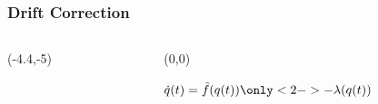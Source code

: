 \begin{frame}
	\frametitle{Drift Correction}
		\begin{columns}[T] %
			\begin{column}{.55\textwidth}
			\centering
				\begin{textblock}{0}(-4.4,-5)
					
				\end{textblock}
			\end{column}
			\hfill
			\begin{column}{0.45\textwidth}
				\begin{textblock}{.9\columnwidth}(0,0)
					\begin{block}{}
					\centering
						\( \dot{q}(t) = \tilde{f}(q(t))\only<2->{-\lambda(q(t))} \)
					\end{block}
				\end{textblock}
				\end{column}
		\end{columns}
\end{frame}


